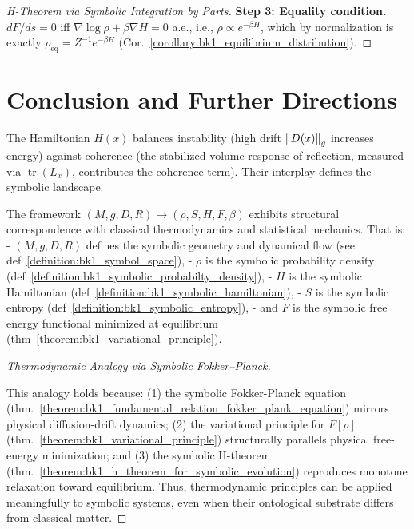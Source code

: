 \begin{theorem}
\begin{proof}[H-Theorem via Symbolic Integration by Parts]
\textbf{Step 3: Equality condition.}
$dF/ds = 0$ iff $\nabla\log\rho + \beta\nabla H = 0$ a.e., i.e., $\rho \propto e^{-\beta H}$,
which by normalization is exactly $\rho_{\text{eq}} = Z^{-1}e^{-\beta H}$
(Cor.~\ref{corollary:bk1_equilibrium_distribution}).
\end{proof}
\end{theorem}

\section{Conclusion and Further Directions}
\label{sec:bk1_conclusion_and_further_directions}

\begin{remark}
The Hamiltonian $H(x)$ balances instability (high drift $\left\|D(x)\right\|_g$ increases energy) against coherence (the stabilized volume response of reflection, measured via $\operatorname{tr}(L_x)$, contributes the coherence term). Their interplay defines the symbolic landscape.
\end{remark}

\begin{theorem}
\label{theorem:bk1_sructurual_correspondence}
The framework $(M, g, D, R) \to (\rho, S, H, F, \beta)$ exhibits structural correspondence with classical thermodynamics and statistical mechanics. That is:
- $(M, g, D, R)$ defines the symbolic geometry and dynamical flow (see def~\ref{definition:bk1_symbol_space}),
- $\rho$ is the symbolic probability density (def~\ref{definition:bk1_symbolic_probabilty_density}),
- $H$ is the symbolic Hamiltonian (def~\ref{definition:bk1_symbolic_hamiltonian}),
- $S$ is the symbolic entropy (def~\ref{definition:bk1_symbolic_entropy}),
- and $F$ is the symbolic free energy functional minimized at equilibrium (thm~\ref{theorem:bk1_variational_principle}).

\begin{proof}[Thermodynamic Analogy via Symbolic Fokker--Planck]
\label{proof:bk1_sketch_thermo_analogy_fokker_planck}
\leavevmode

This analogy holds because: (1) the symbolic Fokker-Planck equation (thm.~\ref{theorem:bk1_fundamental_relation_fokker_plank_equation}) mirrors physical diffusion-drift dynamics; (2) the variational principle for $F[\rho]$ (thm.~\ref{theorem:bk1_variational_principle}) structurally parallels physical free-energy minimization; and (3) the symbolic H-theorem (thm.~\ref{theorem:bk1_h_theorem_for_symbolic_evolution}) reproduces monotone relaxation toward equilibrium. Thus, thermodynamic principles can be applied meaningfully to symbolic systems, even when their ontological substrate differs from classical matter.
\end{proof}
\end{theorem}

